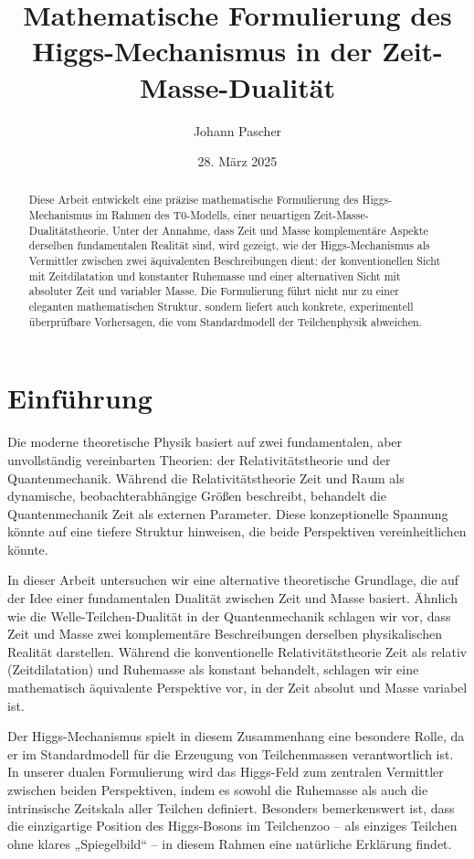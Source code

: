 \documentclass[a4paper,12pt]{article}
\title{Mathematische Formulierung des Higgs-Mechanismus in der Zeit-Masse-Dualität}
\author{Johann Pascher}
\date{28. März 2025}
\begin{document}
	
	\maketitle
	
	\begin{abstract}
		Diese Arbeit entwickelt eine präzise mathematische Formulierung des Higgs-Mechanismus im Rahmen des T0-Modells, einer neuartigen Zeit-Masse-Dualitätstheorie. Unter der Annahme, dass Zeit und Masse komplementäre Aspekte derselben fundamentalen Realität sind, wird gezeigt, wie der Higgs-Mechanismus als Vermittler zwischen zwei äquivalenten Beschreibungen dient: der konventionellen Sicht mit Zeitdilatation und konstanter Ruhemasse und einer alternativen Sicht mit absoluter Zeit und variabler Masse. Die Formulierung führt nicht nur zu einer eleganten mathematischen Struktur, sondern liefert auch konkrete, experimentell überprüfbare Vorhersagen, die vom Standardmodell der Teilchenphysik abweichen.
	\end{abstract}
	
	\tableofcontents
	\newpage
	
	\section{Einführung}
	Die moderne theoretische Physik basiert auf zwei fundamentalen, aber unvollständig vereinbarten Theorien: der Relativitätstheorie und der Quantenmechanik. Während die Relativitätstheorie Zeit und Raum als dynamische, beobachterabhängige Größen beschreibt, behandelt die Quantenmechanik Zeit als externen Parameter. Diese konzeptionelle Spannung könnte auf eine tiefere Struktur hinweisen, die beide Perspektiven vereinheitlichen könnte.
	
	In dieser Arbeit untersuchen wir eine alternative theoretische Grundlage, die auf der Idee einer fundamentalen Dualität zwischen Zeit und Masse basiert. Ähnlich wie die Welle-Teilchen-Dualität in der Quantenmechanik schlagen wir vor, dass Zeit und Masse zwei komplementäre Beschreibungen derselben physikalischen Realität darstellen. Während die konventionelle Relativitätstheorie Zeit als relativ (Zeitdilatation) und Ruhemasse als konstant behandelt, schlagen wir eine mathematisch äquivalente Perspektive vor, in der Zeit absolut und Masse variabel ist.
	
	Der Higgs-Mechanismus spielt in diesem Zusammenhang eine besondere Rolle, da er im Standardmodell für die Erzeugung von Teilchenmassen verantwortlich ist. In unserer dualen Formulierung wird das Higgs-Feld zum zentralen Vermittler zwischen beiden Perspektiven, indem es sowohl die Ruhemasse als auch die intrinsische Zeitskala aller Teilchen definiert. Besonders bemerkenswert ist, dass die einzigartige Position des Higgs-Bosons im Teilchenzoo – als einziges Teilchen ohne klares „Spiegelbild“ – in diesem Rahmen eine natürliche Erklärung findet.
	
\end{document}
